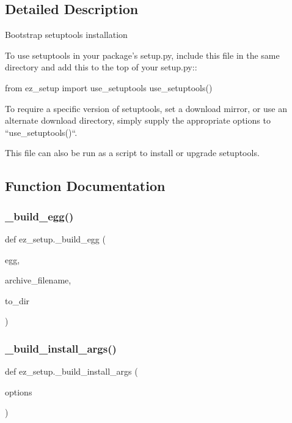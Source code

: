 \subsection{Detailed Description}
\begin{DoxyVerb}Bootstrap setuptools installation

To use setuptools in your package's setup.py, include this
file in the same directory and add this to the top of your setup.py::

from ez_setup import use_setuptools
use_setuptools()

To require a specific version of setuptools, set a download
mirror, or use an alternate download directory, simply supply
the appropriate options to ``use_setuptools()``.

This file can also be run as a script to install or upgrade setuptools.
\end{DoxyVerb}
 

\subsection{Function Documentation}
\mbox{\label{namespaceez__setup_a8b92d87596f54a2f039b56e2c20187a8}} 
\subsubsection{\texorpdfstring{\+\_\+build\+\_\+egg()}{\_build\_egg()}}
{\footnotesize\ttfamily def ez\+\_\+setup.\+\_\+build\+\_\+egg (\begin{DoxyParamCaption}\item[{}]{egg,  }\item[{}]{archive\+\_\+filename,  }\item[{}]{to\+\_\+dir }\end{DoxyParamCaption})\hspace{0.3cm}{\ttfamily [private]}}

\mbox{\label{namespaceez__setup_a64abeb67b326053d9ba41f66c52858cc}} 
\subsubsection{\texorpdfstring{\+\_\+build\+\_\+install\+\_\+args()}{\_build\_install\_args()}}
{\footnotesize\ttfamily def ez\+\_\+setup.\+\_\+build\+\_\+install\+\_\+args (\begin{DoxyParamCaption}\item[{}]{options }\end{DoxyParamCaption})\hspace{0.3cm}{\ttfamily [private]}}


